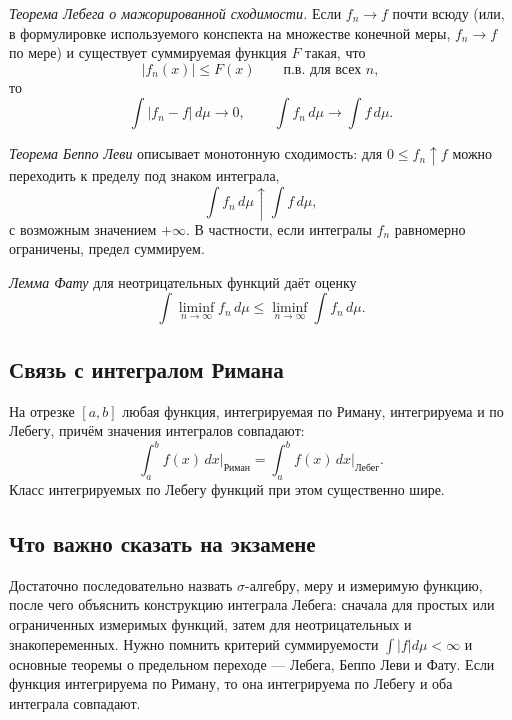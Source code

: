 \emph{Теорема Лебега о мажорированной сходимости.} Если $f_n\to f$ почти всюду
(или, в формулировке используемого конспекта на множестве конечной меры,
$f_n\to f$ по мере) и существует суммируемая функция $F$ такая, что
\[
    |f_n(x)|\leq F(x)\qquad\text{п.в. для всех }n,
\]
то
\[
    \int |f_n-f|\,d\mu\to0,
    \qquad
    \int f_n\,d\mu\to\int f\,d\mu.
\]

\emph{Теорема Беппо Леви} описывает монотонную сходимость: для
$0\leq f_n\uparrow f$ можно переходить к пределу под знаком интеграла,
\[
    \int f_n\,d\mu\uparrow\int f\,d\mu,
\]
с возможным значением $+\infty$. В частности, если интегралы $f_n$ равномерно
ограничены, предел суммируем.

\emph{Лемма Фату} для неотрицательных функций даёт оценку
\[
    \int \liminf_{n\to\infty}f_n\,d\mu
    \leq
    \liminf_{n\to\infty}\int f_n\,d\mu.
\]

\subsection{Связь с интегралом Римана}

На отрезке $[a,b]$ любая функция, интегрируемая по Риману, интегрируема и по
Лебегу, причём значения интегралов совпадают:
\[
    \int_a^b f(x)\,dx\bigg|_{\text{Риман}}
    =
    \int_a^b f(x)\,dx\bigg|_{\text{Лебег}}.
\]
Класс интегрируемых по Лебегу функций при этом существенно шире.

\subsection{Что важно сказать на экзамене}

Достаточно последовательно назвать $\sigma$-алгебру, меру и измеримую функцию,
после чего объяснить конструкцию интеграла Лебега: сначала для простых или
ограниченных измеримых функций, затем для неотрицательных и знакопеременных.
Нужно помнить критерий суммируемости $\int|f|d\mu<\infty$ и основные теоремы о
предельном переходе --- Лебега, Беппо Леви и Фату. Если функция интегрируема по
Риману, то она интегрируема по Лебегу и оба интеграла совпадают.

\newpage
